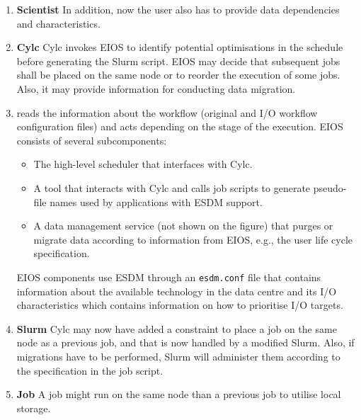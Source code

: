 \documentclass{superfri}
\begin{document}
\begin{enumerate}

  \item \textbf{Scientist} In addition, now the user also has to provide data dependencies and characteristics.

  \item \textbf{Cylc}
  Cylc invokes EIOS to identify potential optimisations in the schedule before generating the Slurm script.
  EIOS may decide that subsequent jobs shall be placed on the same node or to reorder the execution of some jobs.
  Also, it may provide information for conducting data migration.

  \item \textbf{\color{red}{EIOS}} reads the information about the workflow (original and I/O workflow configuration files) and acts depending on the stage of the execution.
  EIOS consists of several subcomponents:

    \begin{itemize}

      \item The high-level scheduler that interfaces with Cylc.

      \item A tool that interacts with Cylc and calls job scripts to generate pseudo-file names used by applications with ESDM support.

      \item A data management service (not shown on the figure) that purges or migrate data according to information from EIOS, e.g., the user life cycle specification.

    \end{itemize}

  EIOS components use ESDM through an \texttt{esdm.conf} file that contains information about the available technology in the data centre and its I/O characteristics which contains information on how to prioritise I/O targets.

  \item \textbf{Slurm}
  Cylc may now have added a constraint to place a job on the same node as a previous job, and that is now handled by a modified Slurm.
  Also, if migrations have to be performed, Slurm will administer them according to the specification in the job script.

  \item \textbf{Job}
  A job might run on the same node than a previous job to utilise local storage.


\end{enumerate}
\end{document}
